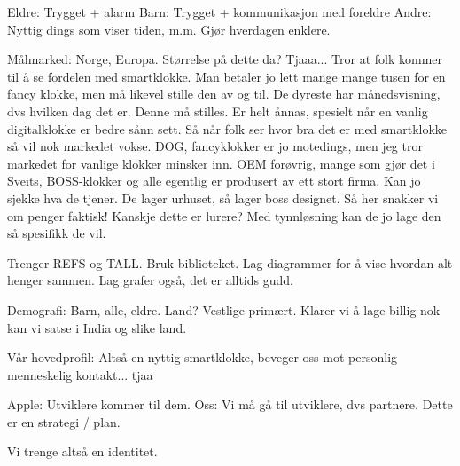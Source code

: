 Eldre: Trygget + alarm
Barn: Trygget + kommunikasjon med foreldre
Andre: Nyttig dings som viser tiden, m.m. Gjør hverdagen enklere.

Målmarked: Norge, Europa. Størrelse på dette da? Tjaaa... Tror at folk kommer
til å se fordelen med smartklokke. Man betaler jo lett mange mange tusen for en
fancy klokke, men må likevel stille den av og til. De dyreste har
månedsvisning, dvs hvilken dag det er. Denne må stilles. Er helt ånnas,
spesielt når en vanlig digitalklokke er bedre sånn sett. Så når folk ser hvor
bra det er med smartklokke så vil nok markedet vokse. DOG, fancyklokker er jo
motedings, men jeg tror markedet for vanlige klokker minsker inn. OEM forøvrig,
mange som gjør det i Sveits, BOSS-klokker og alle egentlig er produsert av ett
stort firma. Kan jo sjekke hva de tjener. De lager urhuset, så lager boss
designet. Så her snakker vi om penger faktisk! Kanskje dette er lurere? Med
tynnløsning kan de jo lage den så spesifikk de vil.

Trenger REFS og TALL. Bruk biblioteket. Lag diagrammer for å vise hvordan alt
henger sammen. Lag grafer også, det er alltids gudd.

Demografi: Barn, alle, eldre. Land? Vestlige primært. Klarer vi å lage billig
nok kan vi satse i India og slike land.

Vår hovedprofil: Altså en nyttig smartklokke, beveger oss mot personlig
menneskelig kontakt... tjaa 

Apple: Utviklere kommer til dem. Oss: Vi må gå til utviklere, dvs partnere.
Dette er en strategi / plan.

Vi trenge altså en identitet.












